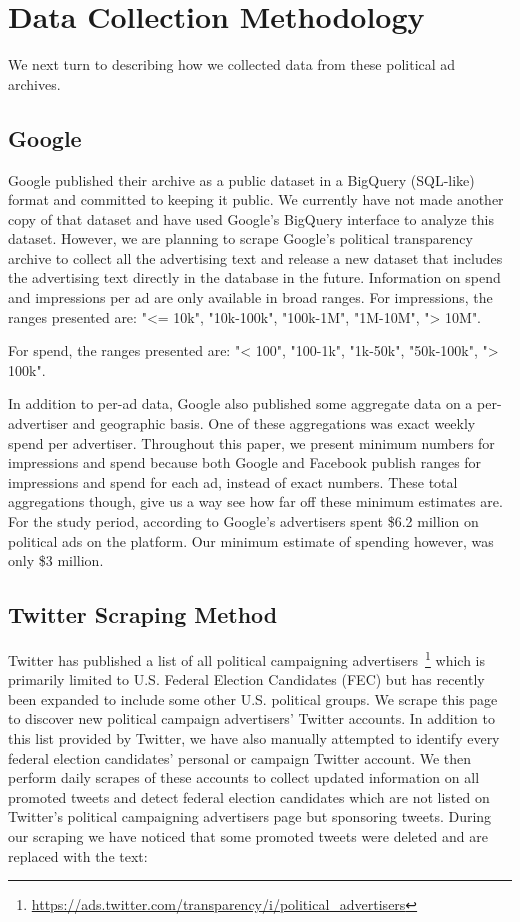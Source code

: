 \documentclass[fleqn,10pt]{wlscirep}
\begin{document}
\section*{Data Collection Methodology}

We next turn to describing how we collected data from these political ad archives. 

\subsection*{Google}

Google published their archive as a public dataset in a BigQuery (SQL-like) format and committed to keeping it public. We currently have not made another copy of that dataset and have used Google's BigQuery interface to analyze this dataset. However, we are planning to scrape Google's political transparency archive to collect all the advertising text and release a new dataset that includes the advertising text directly in the database in the future.
Information on spend and impressions per ad are only available in broad ranges. For impressions, the ranges presented are:
    "<= 10k", "10k-100k", "100k-1M", "1M-10M", "> 10M".
     
For spend, the ranges presented are:
     "< 100", "100-1k", "1k-50k", "50k-100k", "> 100k".
     
In addition to per-ad data, Google also published some aggregate data on a per-advertiser and geographic basis. One of these aggregations was exact weekly spend per advertiser. Throughout this paper, we present minimum numbers for impressions and spend because both Google and Facebook publish ranges for impressions and spend for each ad, instead of exact numbers. These total aggregations though, give us a way see how far off these minimum estimates are. For the study period, according to Google's advertisers spent \$6.2 million on political ads on the platform. Our minimum estimate of spending however, was only \$3 million.


\subsection*{Twitter Scraping Method}

Twitter has published a list of all political campaigning advertisers~\footnote{\url{https://ads.twitter.com/transparency/i/political_advertisers}} which is primarily limited to U.S. Federal Election Candidates (FEC) but has recently been expanded to include some other U.S. political groups. We scrape this page to discover new political campaign advertisers' Twitter accounts. In addition to this list provided by Twitter, we have also manually attempted to identify every federal election candidates' personal or campaign Twitter account. We then perform daily scrapes of these accounts to collect updated information on all promoted tweets and detect federal election candidates which are not listed on Twitter's political campaigning advertisers page but sponsoring tweets. During our scraping we have noticed that some promoted tweets were deleted and are replaced with the text:
\end{document}

